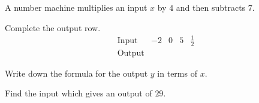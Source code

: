  A number machine multiplies an input $x$ by $4$ and then subtracts $7$.
\begin{subparts}
  \item Complete the output row.
  \[
  \begin{array}{c|cccc}
  \text{Input}&-2&0&5&\frac12\\ \hline
  \text{Output}&&&&
  \end{array}
  \]
  \item Write down the formula for the output $y$ in terms of $x$.
  \item Find the input which gives an output of $29$.
\end{subparts}
